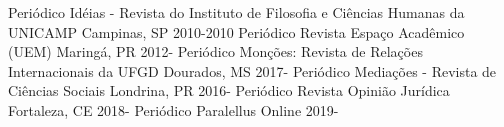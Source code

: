 \begin{cvhonors}
  \cvhonor
    {Periódico}
    {Idéias - Revista do Instituto de Filosofia e Ciências Humanas da UNICAMP}
    {Campinas, SP}
    {2010-2010}
  \cvhonor
    {Periódico}
    {Revista Espaço Acadêmico (UEM)}
    {Maringá, PR}
    {2012-}
  \cvhonor
    {Periódico}
    {Monções: Revista de Relações Internacionais da UFGD}
    {Dourados, MS}
    {2017-}
  \cvhonor
    {Periódico}
    {Mediações - Revista de Ciências Sociais}
    {Londrina, PR}
    {2016-}
  \cvhonor
    {Periódico}
    {Revista Opinião Jurídica}
    {Fortaleza, CE}
    {2018-}
  \cvhonor
    {Periódico}
    {Paralellus}
    {Online}
    {2019-}
\end{cvhonors}
\pagebreak
